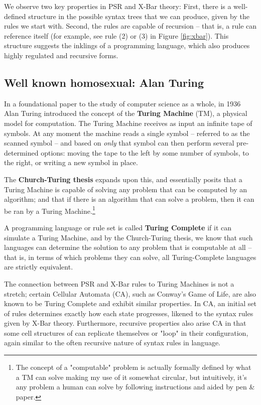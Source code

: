 \documentclass[runningheads]{llncs}
\begin{document}
We observe two key properties in PSR and X-Bar theory: First, there is a well-defined structure in the possible syntax trees that we can produce, given by the rules we start with. Second, the rules are capable of recursion -- that is, a rule can reference itself (for example, see rule (2) or (3) in Figure \ref{fig:xbar}). This structure suggests the inklings of a programming language, which also produces highly regulated and recursive forms.
\subsection{Well known homosexual: Alan Turing}
In a foundational paper to the study of computer science as a whole, in 1936 Alan Turing introduced the concept of the \textbf{Turing Machine} (TM), a physical model for computation. %
The Turing Machine receives as input an infinite tape of symbols. At any moment the machine reads a single symbol -- referred to as the scanned symbol -- and based on \textit{only} that symbol can then perform several pre-determined options: moving the tape to the left by some number of symbols, to the right, or writing a new symbol in place.

The \textbf{Church-Turing thesis} %
expands upon this, and essentially posits that a Turing Machine is capable of solving any problem that can be computed by an algorithm; and that if there is an algorithm that can solve a problem, then it can be ran by a Turing Machine.\footnote{The concept of a "computable" problem is actually formally defined by what a TM can solve making my use of it somewhat circular, but intuitively, it's any problem a human can solve by following instructions and aided by pen \& paper.}

A programming language or rule set is called \textbf{Turing Complete} if it can simulate a Turing Machine, and by the Church-Turing thesis, we know that such languages can determine the solution to any problem that is computable at all -- that is, in terms of which problems they can solve, all Turing-Complete languages are strictly equivalent.

The connection between PSR and X-Bar rules to Turing Machines is not a stretch; certain Cellular Automata (CA), such as Conway's Game of Life, are also known to be Turing Complete and exhibit similar properties. %
In CA, an initial set of rules determines exactly how each state progresses, likened to the syntax rules given by X-Bar theory. Furthermore, recursive properties also arise CA in that some cell structures of can replicate themselves or "loop" in their configuration, again similar to the often recursive nature of syntax rules in language.
\end{document}
